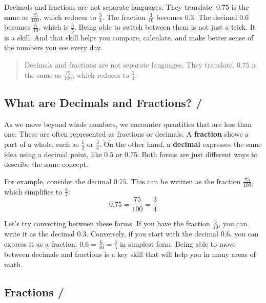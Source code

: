 Decimals and fractions are not separate languages. They translate. \(0.75\) is
the same as \(\frac{75}{100}\), which reduces to \(\frac{3}{4}\). The fraction
\(\frac{3}{10}\) becomes \(0.3\). The decimal \(0.6\) becomes \(\frac{6}{10}\),
which is \(\frac{3}{5}\). Being able to switch between them is not just a trick.
It is a skill. And that skill helps you compare, calculate, and make better
sense of the numbers you see every day.

\blockquote{Decimals and fractions are not separate languages. They translate.
\(0.75\) is the same as \(\frac{75}{100}\), which reduces to \(\frac{3}{4}\).}



\subsection{What are Decimals and Fractions? / }

As we move beyond whole numbers, we encounter quantities that are less than one.
These are often represented as fractions or decimals. A \textbf{fraction} shows
a part of a whole, such as \(\frac{1}{2}\) or \(\frac{3}{4}\). On the other
hand, a \textbf{decimal} expresses the same idea using a decimal point, like
\(0.5\) or \(0.75\). Both forms are just different ways to describe the same
concept.


For example, consider the decimal \(0.75\). This can be written as the fraction
\(\frac{75}{100}\), which simplifies to \(\frac{3}{4}\):
\[
0.75 = \frac{75}{100} = \frac{3}{4}
\]


Let's try converting between these forms. If you have the fraction
\(\frac{3}{10}\), you can write it as the decimal \(0.3\). Conversely, if you
start with the decimal \(0.6\), you can express it as a fraction: \(0.6 =
\frac{6}{10} = \frac{3}{5}\) in simplest form. Being able to move between
decimals and fractions is a key skill that will help you in many areas of math.








\subsection*{Fractions / }

